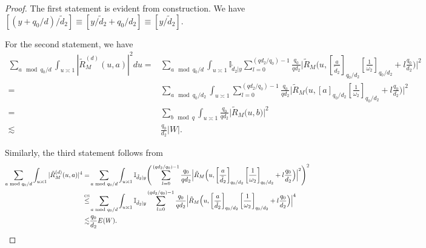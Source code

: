 \begin{proof}
    The first statement is evident from construction. We have $[(y+q_0/d)/\tilde{d}_2] \equiv [y/\tilde{d}_2 + q_0/d_2] \equiv [y/\tilde{d}_2]$.
    
    For the second statement, we have \begin{align*}
        \sum_{a\mod q_0/d} \int_{u\asymp 1 } |\tilde{R}^{(d)}_M(u,a)|^2 du =&  \sum_{a\mod q_0/d} \int_{u\asymp 1 }\mathbb{I}_{\tilde{d}_2|y} \sum_{l=0}^{(qd_2/q_0)-1} \frac{q_0}{qd_2} \Big|\tilde{R}_M\Big(u,\left[\frac{a}{\tilde{d}_2}\right]_{q_0/d_2} \left[\frac{1}{\omega_2}\right]_{q_0/d_2} + l \frac{q_0}{d_2}\Big)\Big|^2\\
       =&\sum_{a\mod q_0/d_2} \int_{u\asymp 1 } \sum_{l=0}^{(qd_2/q_0)-1} \frac{q_0}{qd_2} \Big|\tilde{R}_M\Big(u,\left[a\right]_{q_0/d_2} \left[\frac{1}{\omega_2}\right]_{q_0/d_2} + l \frac{q_0}{d_2}\Big)\Big|^2\\
       =&\sum_{b\mod q} \int_{u\asymp 1 }\frac{q_0}{qd_2} \Big|\tilde{R}_M\Big(u,b\Big)\Big|^2\\
       \lesssim& \frac{q_0}{d_2} |W|.
    \end{align*}

    Similarly, the third statement follows from \begin{align*}
        \sum_{a\mod q_0/d} \int_{u\asymp 1 }|\tilde{R}^{(d)}_M(u,a)|^4 = & 
        \sum_{a\mod q_0/d} \int_{u\asymp 1 }\mathbb{I}_{\tilde{d}_2|y}\Bigg( \sum_{l=0}^{(qd_2/q_0)-1} \frac{q_0}{qd_2} \Big|\tilde{R}_M\Big(u,\left[\frac{a}{\tilde{d}_2}\right]_{q_0/d_2} \left[\frac{1}{\omega_2}\right]_{q_0/d_2} + l \frac{q_0}{d_2}\Big)\Big|^2\Bigg)^2\\
        \stackon{CS}{\leq} &\sum_{a\mod q_0/d} \int_{u\asymp 1 }\mathbb{I}_{\tilde{d}_2|y}\sum_{l=0}^{(qd_2/q_0)-1} \frac{q_0}{qd_2} \Big|\tilde{R}_M\Big(u,\left[\frac{a}{\tilde{d}_2}\right]_{q_0/d_2} \left[\frac{1}{\omega_2}\right]_{q_0/d_2} + l \frac{q_0}{d_2}\Big)\Big|^4 
        \\
        \lesssim & \frac{q_0}{d_2} E(W).
    \end{align*}


\end{proof}
